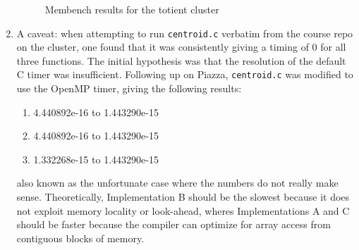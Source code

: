 \documentclass{scrartcl}
\begin{document}
\begin{enumerate}
\begin{figure}[ht!]
\begin{subfigure}[c]{.5\textwidth}
        \end{subfigure}
        \caption{Membench results for the totient cluster\label{fig:cluster}}
      \end{figure}
    \item A caveat: when attempting to run \verb|centroid.c| verbatim from the course repo on the cluster, one found that it was consistently giving a timing of 0 for all three functions. The initial hypothesis was that the resolution of the default C timer was insufficient. Following up on Piazza, \verb|centroid.c| was modified to use the OpenMP timer, giving the following results:
    \begin{enumerate}[label=(\alph*)]
      \item 4.440892e-16 to 1.443290e-15
      \item 4.440892e-16 to 1.443290e-15
      \item 1.332268e-15 to 1.443290e-15
    \end{enumerate}
    also known as the unfortunate case where the numbers do not really make sense. Theoretically, Implementation B should be the slowest because it does not exploit memory locality or look-ahead, wheres Implementations A and C should be faster because the compiler can optimize for array access from contiguous blocks of memory.
  \end{enumerate}
\end{document}
